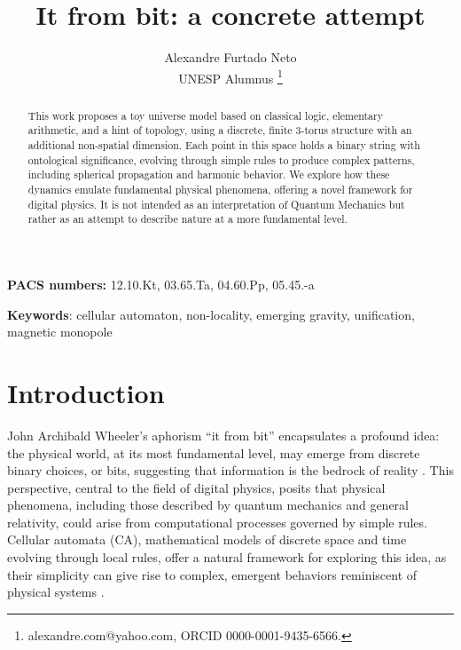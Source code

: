 \documentclass[12pt,english]{article}
\begin{document}
\title{It from bit: a concrete attempt}
\author{Alexandre Furtado Neto \\ UNESP Alumnus \thanks{alexandre.com@yahoo.com, ORCID 0000-0001-9435-6566.}}
\maketitle

\begin{abstract}
This work proposes a toy universe model based on classical logic, elementary arithmetic, and a hint of topology, using a discrete, finite 3-torus structure with an additional non-spatial dimension. Each point in this space holds a binary string with ontological significance, evolving through simple rules to produce complex patterns, including spherical propagation and harmonic behavior. We explore how these dynamics emulate fundamental physical phenomena, offering a novel framework for digital physics.  It is not intended as an interpretation of Quantum Mechanics but rather as an attempt to describe nature at a more fundamental level.

\medskip{}
\end{abstract}

\vfill

\begin{center}
\textbf{PACS numbers: }12.10.Kt, 03.65.Ta, 04.60.Pp, 05.45.-a
\par\end{center}

\begin{center}
\textbf{Keywords}: cellular automaton, non-locality, emerging gravity, unification, magnetic monopole
\par\end{center}

\newpage


\section{Introduction}

John Archibald Wheeler's aphorism ``it from bit'' encapsulates a profound idea: the physical world, at its most fundamental level, may emerge from discrete binary choices, or bits, suggesting that information is the bedrock of reality \cite{wheeler}. This perspective, central to the field of digital physics, posits that physical phenomena, including those described by quantum mechanics and general relativity, could arise from computational processes governed by simple rules. Cellular automata (CA), mathematical models of discrete space and time evolving through local rules, offer a natural framework for exploring this idea, as their simplicity can give rise to complex, emergent behaviors reminiscent of physical systems \cite{wolfram,zuse,fredkin}.
\end{document}
